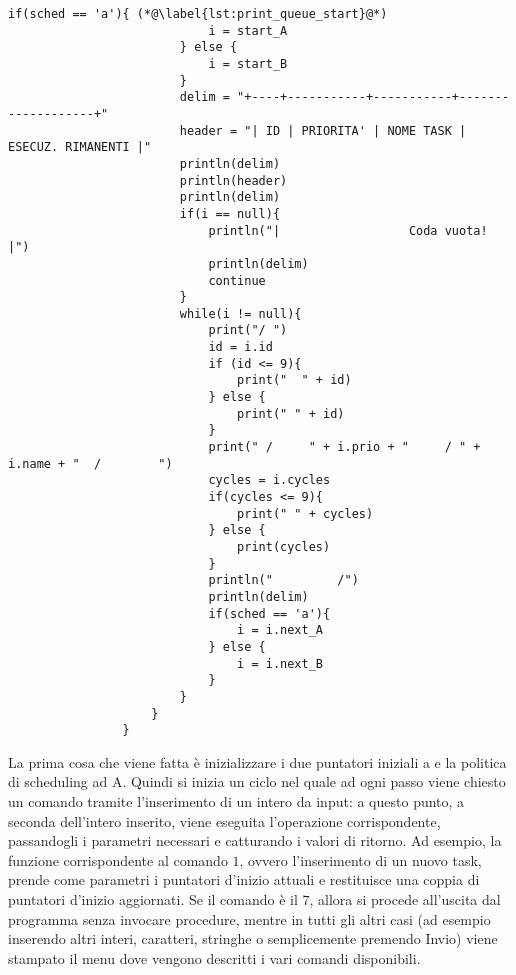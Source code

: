 \begin{center}
\begin{lstlisting}[language=pseudo, gobble=14]
                        if(sched == 'a'){ (*@\label{lst:print_queue_start}@*)
                            i = start_A
                        } else {
                            i = start_B
                        }
                        delim = "+----+-----------+-----------+-------------------+"
                        header = "| ID | PRIORITA' | NOME TASK | ESECUZ. RIMANENTI |"
                        println(delim)
                        println(header)
                        println(delim)
                        if(i == null){
                            println("|                  Coda vuota!                   |")
                            println(delim)
                            continue
                        }
                        while(i != null){
                            print("/ ")
                            id = i.id
                            if (id <= 9){
                                print("  " + id)
                            } else {
                                print(" " + id)
                            }
                            print(" /     " + i.prio + "     / " + i.name + "  /        ")
                            cycles = i.cycles
                            if(cycles <= 9){
                                print(" " + cycles)
                            } else {
                                print(cycles)
                            }
                            println("         /")
                            println(delim)
                            if(sched == 'a'){
                                i = i.next_A
                            } else {
                                i = i.next_B
                            }
                        }
                    }
                }\end{lstlisting}
        \end{center}
        
        La prima cosa che viene fatta è inizializzare i due puntatori iniziali a  e la politica di scheduling ad A. Quindi si inizia un ciclo nel quale ad ogni passo viene chiesto un comando tramite l'inserimento di un intero da input: a questo punto, a seconda dell'intero inserito, viene eseguita l'operazione corrispondente, passandogli i parametri necessari e catturando i valori di ritorno. Ad esempio, la funzione corrispondente al comando $1$, ovvero l'inserimento di un nuovo task, prende come parametri i puntatori d'inizio attuali e restituisce una coppia di puntatori d'inizio aggiornati. Se il comando è il $7$, allora si procede all'uscita dal programma senza invocare procedure, mentre in tutti gli altri casi (ad esempio inserendo altri interi, caratteri, stringhe o semplicemente premendo Invio) viene stampato il menu dove vengono descritti i vari comandi disponibili.
        

